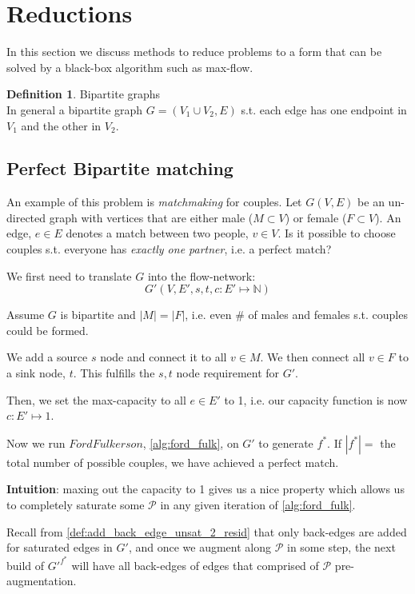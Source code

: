 \documentclass{article}
\theoremstyle{definition}
\newtheorem{definition}{Definition}[section]
\begin{document}
\section{Reductions}
In this section we discuss methods to reduce problems to a form that can be solved by a black-box algorithm such as max-flow.

\begin{definition}{Bipartite graphs}
	\\In general a bipartite graph $G=(V_1 \cup V_2, E)$ s.t. each edge has one endpoint in $V_1$ and the other in $V_2$.
\end{definition}

\subsection{Perfect Bipartite matching}
An example of this problem is \textit{matchmaking} for couples. Let $G(V,E)$ be an un-directed graph with vertices that are either male ($M \subset V$) or female ($F \subset V$). An edge, $e \in E$ denotes a match between two people, $v \in V$. Is it possible to choose couples s.t. everyone has \textit{exactly one partner}, i.e. a perfect match?

We first need to translate $G$ into the flow-network: $$G'(V,E',s,t,c: E' \mapsto \mathbb{N})$$

Assume $G$ is bipartite and $|M|=|F|$, i.e. even \# of males and females s.t. couples could be formed.

We add a source $s$ node and connect it to all $v \in M$. We then connect all $v \in F$ to a sink node, $t$. This fulfills the $s,t$ node requirement for $G'$.

Then, we set the max-capacity to all $e \in E'$ to 1, i.e. our capacity function is now $c : E' \mapsto 1$.

Now we run $FordFulkerson$, \ref{alg:ford_fulk}, on $G'$ to generate $f^*$. If $|f^*| = $ the total number of possible couples, we have achieved a perfect match.

\textbf{Intuition}: maxing out the capacity to 1 gives us a nice property which allows us to completely saturate some $\mathcal{P}$ in any given iteration of \ref{alg:ford_fulk}. 

Recall from \ref{def:add_back_edge_unsat_2_resid} that only back-edges are added for saturated edges in $G'$, and once we augment along $\mathcal{P}$ in some step, the next build of ${G'}^{f^*}$ will have all back-edges of edges that comprised of $\mathcal{P}$ pre-augmentation. 
\end{document}
